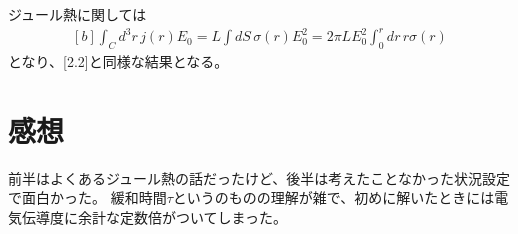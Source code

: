 \documentclass[../ap_2012.tex]{subfiles}
\begin{document}
ジュール熱に関しては
\begin{equation}\begin{aligned}[b]
    \int_C d^3r\, j(r)E_0 = L \int dS\, \sigma(r)E_0^2 = 2\pi L E_0^2 \int_0^r dr\,r\sigma(r)
\end{aligned}\end{equation}
となり、[2.2]と同様な結果となる。

\section*{感想}
前半はよくあるジュール熱の話だったけど、後半は考えたことなかった状況設定で面白かった。
緩和時間\(\tau\)というのものの理解が雑で、初めに解いたときには電気伝導度に余計な定数倍がついてしまった。
\end{document}
